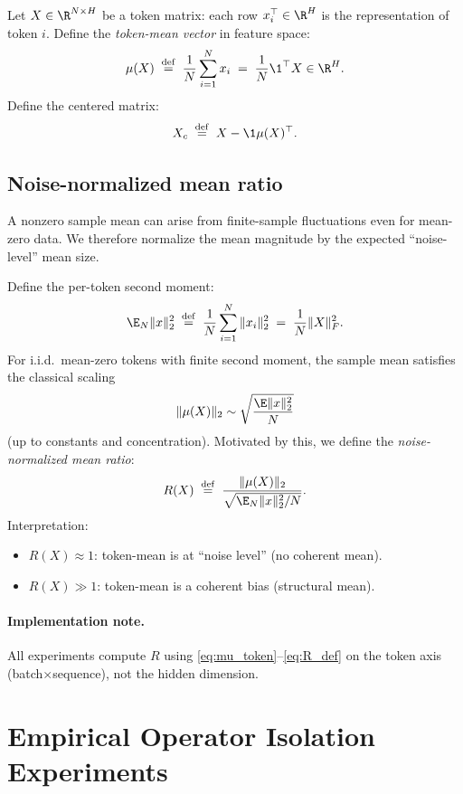 Let $X\in\R^{N\times H}$ be a token matrix: each row $x_i^\top\in\R^H$ is the representation of token $i$.
Define the \emph{token-mean vector} in feature space:
\begin{equation}
\label{eq:mu_token}
\mu(X) \;\stackrel{\mathrm{def}}{=}\; \frac{1}{N}\sum_{i=1}^N x_i \;=\; \frac{1}{N}\1^\top X \in \R^H.
\end{equation}
Define the centered matrix:
\begin{equation}
X_c \;\stackrel{\mathrm{def}}{=}\; X - \1\mu(X)^\top.
\end{equation}

\subsection{Noise-normalized mean ratio}

A nonzero sample mean can arise from finite-sample fluctuations even for mean-zero data.
We therefore normalize the mean magnitude by the expected ``noise-level'' mean size.

Define the per-token second moment:
\begin{equation}
\label{eq:Ex2}
\E_N\|x\|_2^2 \;\stackrel{\mathrm{def}}{=}\; \frac{1}{N}\sum_{i=1}^N \|x_i\|_2^2 \;=\; \frac{1}{N}\|X\|_F^2.
\end{equation}
For i.i.d.\ mean-zero tokens with finite second moment, the sample mean satisfies the classical scaling
\[
\|\mu(X)\|_2 \sim \sqrt{\frac{\E\|x\|_2^2}{N}}
\]
(up to constants and concentration).
Motivated by this, we define the \emph{noise-normalized mean ratio}:
\begin{equation}
\label{eq:R_def}
R(X) \;\stackrel{\mathrm{def}}{=}\; \frac{\|\mu(X)\|_2}{\sqrt{\E_N\|x\|_2^2/N}}.
\end{equation}
Interpretation:
\begin{itemize}
\item $R(X)\approx 1$: token-mean is at ``noise level'' (no coherent mean).
\item $R(X)\gg 1$: token-mean is a coherent bias (structural mean).
\end{itemize}

\paragraph{Implementation note.}
All experiments compute $R$ using \eqref{eq:mu_token}--\eqref{eq:R_def} on the token axis (batch$\times$sequence), not the hidden dimension.

\section{Empirical Operator Isolation Experiments}

